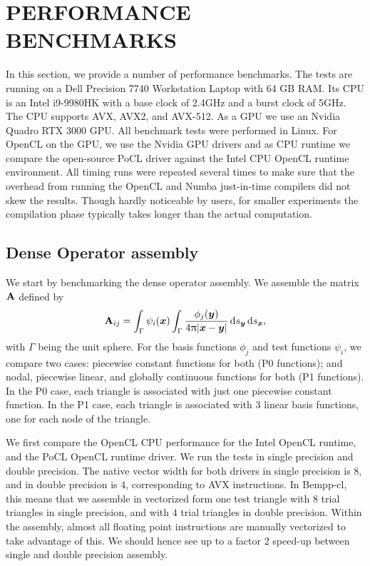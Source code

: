 \section{PERFORMANCE BENCHMARKS}

In this section, we provide a number of performance benchmarks. The tests are running on a Dell Precision 7740 Workstation Laptop with 64 GB RAM. Its CPU is an Intel i9-9980HK with a base clock of 2.4GHz and a burst clock of 5GHz. The CPU supports AVX, AVX2, and AVX-512.
As a GPU we use an Nvidia Quadro RTX 3000 GPU. All benchmark tests were performed in Linux. For OpenCL on the GPU, we use the Nvidia GPU drivers and as CPU runtime we compare the open-source PoCL driver against the Intel CPU OpenCL runtime environment. All timing runs were repeated several times to make sure that the overhead from running the OpenCL and Numba just-in-time compilers did not skew the results. Though hardly noticeable by users, for smaller experiments the compilation phase typically takes longer than the actual computation.

\subsection{Dense Operator assembly}
We start by benchmarking the dense operator assembly. We assemble the matrix $\mathbf{A}$ defined by
$$
\dmat{A}_{ij} = \int_{\Gamma}\psi_i(\bx)\int_{\Gamma}\frac{\phi_j(\by)}{4\uppi |\bx -\by|}\ds[\by]\ds[\bx],
$$
with $\Gamma$ being the unit sphere. For the basis functions $\phi_j$ and test functions $\psi_i$, we compare two cases: piecewise constant functions for both (P0 functions); and nodal, piecewise linear, and globally continuous functions for both (P1 functions). In the P0 case, each triangle is associated with just one piecewise constant function. In the P1 case, each triangle is associated with $3$ linear basis functions, one for each node of the triangle.

We first compare the OpenCL CPU performance for the Intel OpenCL runtime, and the PoCL OpenCL runtime driver. We run the tests in single precision and double precision. The native vector width for both drivers in single precision is $8$, and in double precision is $4$, corresponding to AVX instructions. In Bempp-cl, this means that we assemble in vectorized form one test triangle with $8$ trial triangles in single precision, and with $4$ trial triangles in double precision. Within the assembly, almost all floating point instructions are manually vectorized to take advantage of this. We should hence see up to a factor 2 speed-up between single and double precision assembly.

